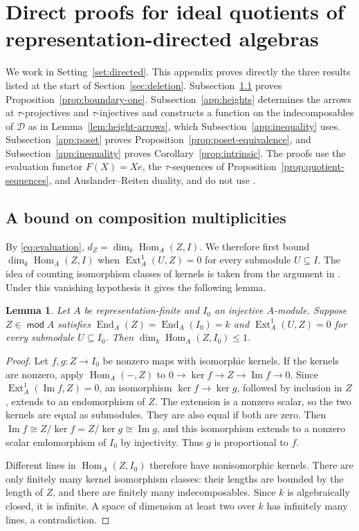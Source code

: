\documentclass[a4paper,reqno,10pt]{amsart}
\newtheorem{lemma}[theorem]{Lemma}
\theoremstyle{definition}
\numberwithin{equation}{section}
\DeclareMathOperator{\moduleCategory}{\mathsf{mod}}
\renewcommand{\mod}{\moduleCategory}
\DeclareMathOperator{\Hom}{Hom}
\DeclareMathOperator{\Ext}{Ext}
\DeclareMathOperator{\End}{End}
\newcommand{\cD}{\mathcal D}
\begin{document}
\appendix
\section{Direct proofs for ideal quotients of representation-directed algebras}\label{app:structural}
We work in Setting~\ref{set:directed}. This appendix proves directly the
three results listed at the start of Section~\ref{sec:deletion}.
Subsection~\ref{app:multiplicity} proves Proposition~\ref{prop:boundary-one}.
Subsection~\ref{app:heights} determines the arrows at \(\tau\)-projectives
and \(\tau\)-injectives and constructs a function on the indecomposables
of \(\cD\) as in Lemma~\ref{lem:height-arrows}, which
Subsection~\ref{app:inequality} uses.
Subsection~\ref{app:poset} proves Proposition~\ref{prop:poset-equivalence},
and Subsection~\ref{app:inequality} proves Corollary~\ref{prop:intrinsic}.
The
proofs use the evaluation functor
\(F(X)=Xe\), the \(\tau\)-sequences of
Proposition~\ref{prop:quotient-sequences}, and Auslander--Reiten duality,
and do not use \cite{RV}.

\subsection{A bound on composition multiplicities}\label{app:multiplicity}
By \eqref{eq:evaluation}, \(d_Z=\dim_k\Hom_A(Z,I)\). We therefore
first bound \(\dim_k\Hom_A(Z,I)\) when \(\Ext_A^1(U,Z)=0\) for every
submodule \(U\subseteq I\).
The idea of counting isomorphism classes of kernels is taken from the
argument in \cite[Section~6]{RV}. Under this vanishing hypothesis it
gives the following lemma.

\begin{lemma}\label{lem:finite-kernel}
Let \(A\) be representation-finite and \(I_0\) an injective \(A\)-module.
Suppose \(Z\in\mod A\) satisfies \(\End_A(Z)=\End_A(I_0)=k\) and
\(\Ext_A^1(U,Z)=0\) for every submodule \(U\subseteq I_0\).
Then \(\dim_k\Hom_A(Z,I_0)\leq1\).
\end{lemma}
\begin{proof}
Let \(f,g:Z\to I_0\) be nonzero maps with isomorphic kernels.
If the kernels are nonzero, apply \(\Hom_A(-,Z)\) to
\(0\to\ker f\to Z\to\operatorname{Im}f\to0\).
Since \(\Ext_A^1(\operatorname{Im}f,Z)=0\), an isomorphism
\(\ker f\to\ker g\), followed by inclusion in \(Z\), extends
to an endomorphism of \(Z\).
The extension is a nonzero scalar, so the two kernels are equal as
submodules. They are also equal if both are zero. Then
\(\operatorname{Im}f\cong Z/\ker f=Z/\ker g\cong\operatorname{Im}g\), and
this isomorphism extends to a nonzero scalar
endomorphism of \(I_0\) by injectivity. Thus \(g\) is proportional to \(f\).

Different lines in \(\Hom_A(Z,I_0)\) therefore have nonisomorphic kernels.
There are only finitely many kernel isomorphism classes: their lengths are
bounded by the length of \(Z\), and there are finitely many indecomposables.
Since \(k\) is algebraically closed, it is infinite. A space of dimension
at least two over \(k\) has infinitely many
lines, a contradiction.
\end{proof}
\end{document}
